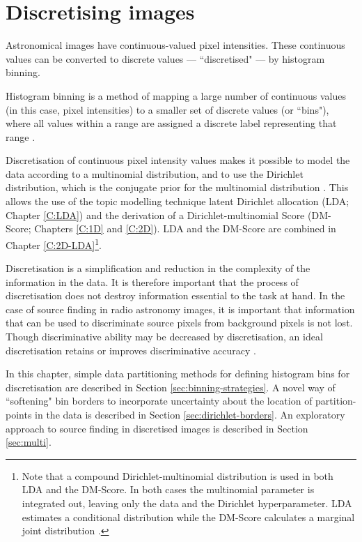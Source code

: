 \chapter{Discretising images}\label{C:BIN}

Astronomical images have continuous-valued pixel intensities. These continuous values can be converted to discrete values --- ``discretised" --- by histogram binning. 

Histogram binning is a method of mapping a large number of continuous values (in this case, pixel intensities) to a smaller set of discrete values (or ``bins"), where all values within a range are assigned a discrete label representing that range \cite{yang2010discretization}.

Discretisation of continuous pixel intensity values makes it possible to model the data according to a multinomial distribution, and to use the Dirichlet distribution, which is the conjugate prior for the multinomial distribution \cite{diaconis1979conjugate,frigyik2010introduction,johnson1997discrete,kotz2004continuous}. This allows the use of the topic modelling technique latent Dirichlet allocation \cite{blei2003latent} (LDA; Chapter \ref{C:LDA}) and the derivation of a Dirichlet-multinomial Score (DM-Score; Chapters \ref{C:1D} and \ref{C:2D}). LDA and the DM-Score are combined in Chapter \ref{C:2D-LDA}\footnote{Note that a compound Dirichlet-multinomial distribution is used in both LDA and the DM-Score. In both cases the multinomial parameter is integrated out, leaving only the data and the Dirichlet hyperparameter. LDA estimates a conditional distribution while the DM-Score calculates a marginal joint distribution \cite{blei2003latent, ng2011dirichlet}.}. 

Discretisation is a simplification and reduction in the complexity of the information in the data. It is therefore important that the process of discretisation does not destroy information essential to the task at hand. In the case of source finding in radio astronomy images, it is important that information that can be used to discriminate source pixels from background pixels is not lost. Though discriminative ability may be decreased by discretisation, an ideal discretisation retains or improves discriminative accuracy \cite{kotsiantis2006discretization,liu2002discretization}.

In this chapter, simple data partitioning methods for defining histogram bins for discretisation are described in Section \ref{sec:binning-strategies}. A novel way of ``softening" bin borders to incorporate uncertainty about the location of partition-points in the data is described in Section \ref{sec:dirichlet-borders}. An exploratory approach to source finding in discretised images is described in Section \ref{sec:multi}.


